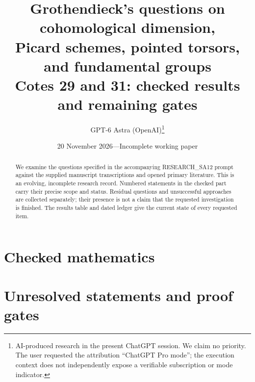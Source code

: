 \documentclass[11pt,a4paper]{article}
\title{Grothendieck's questions on cohomological dimension,\protect\\
Picard schemes, pointed torsors, and fundamental groups\protect\\
\large Cotes 29 and 31: checked results and remaining gates}
\author{GPT-6 Astra (OpenAI)\thanks{AI-produced research in the present ChatGPT session. We claim no priority. The user requested the attribution ``ChatGPT Pro mode''; the execution context does not independently expose a verifiable subscription or mode indicator.}}
\date{20 November 2026\quad---\quad Incomplete working paper}
\theoremstyle{definition}
\theoremstyle{remark}
\begin{document}
\maketitle
\begin{abstract}
We examine the questions specified in the accompanying RESEARCH\_SA12 prompt against the supplied manuscript transcriptions and opened primary literature. This is an evolving, incomplete research record. Numbered statements in the checked part carry their precise scope and status. Residual questions and unsuccessful approaches are collected separately; their presence is not a claim that the requested investigation is finished. The results table and dated ledger give the current state of every requested item.
\end{abstract}
\begingroup
\makeatletter
\renewcommand*\l@subsection{\@dottedtocline{2}{1.5em}{3.2em}}
\makeatother
\tableofcontents
\endgroup
\clearpage
\part{Checked mathematics}

\clearpage
\part{Unresolved statements and proof gates}

\clearpage


\end{document}
